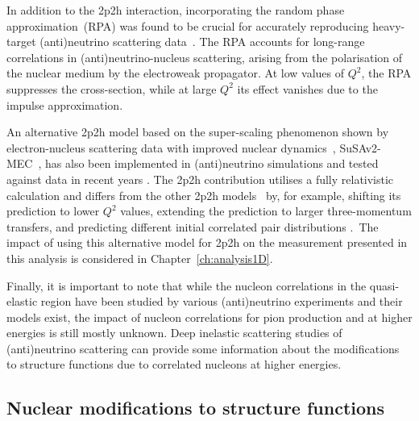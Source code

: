 In addition to the 2p2h interaction, incorporating the random phase approximation~(RPA) was found to be crucial for accurately reproducing heavy-target (anti)neutrino scattering data~\cite{2p2hNieves2011_PhysRevC.83.045501, PhysRevC.80.065501}. The RPA accounts for long-range correlations in (anti)neutrino-nucleus scattering, arising from the polarisation of the nuclear medium by the electroweak propagator. At low values of $Q^2$, the RPA suppresses the cross-section, while at large $Q^2$ its effect vanishes due to the impulse approximation.

An alternative 2p2h model based on the super-scaling phenomenon shown by electron-nucleus scattering data \cite{PhysRevLett.82.3212, PhysRevC.60.065502, PhysRevC.65.025502} with improved nuclear dynamics~\cite{PhysRevC.74.015502, PhysRevC.71.015501, PhysRevC.73.035503, PhysRevC.80.024605}, SuSAv2-MEC~\cite{PhysRevD.94.093004}, has also been implemented in (anti)neutrino simulations and tested against data in recent years \cite{PhysRevD.101.033003, SuSAreweight_MINERvA}. The 2p2h contribution utilises a fully relativistic calculation and differs from the other 2p2h models~\cite{2p2hNieves2011_PhysRevC.83.045501,PhysRevC.80.065501} by, for example, shifting its prediction to lower $Q^2$ values, extending the prediction to larger three-momentum transfers, and predicting different initial correlated pair distributions \cite{SuSAreweight_MINERvA}.~The impact of using this alternative model for 2p2h on the measurement presented in this analysis is considered in 
Chapter~\ref{ch:analysis1D}.

Finally, it is important to note that while the nucleon correlations in the quasi-elastic region have been studied by various (anti)neutrino experiments and their models exist, the impact of nucleon correlations for pion production and at higher energies is still mostly unknown. Deep inelastic scattering studies of (anti)neutrino scattering can provide some information about the modifications to structure functions due to correlated nucleons at higher energies.




\subsection{Nuclear modifications to structure functions}


